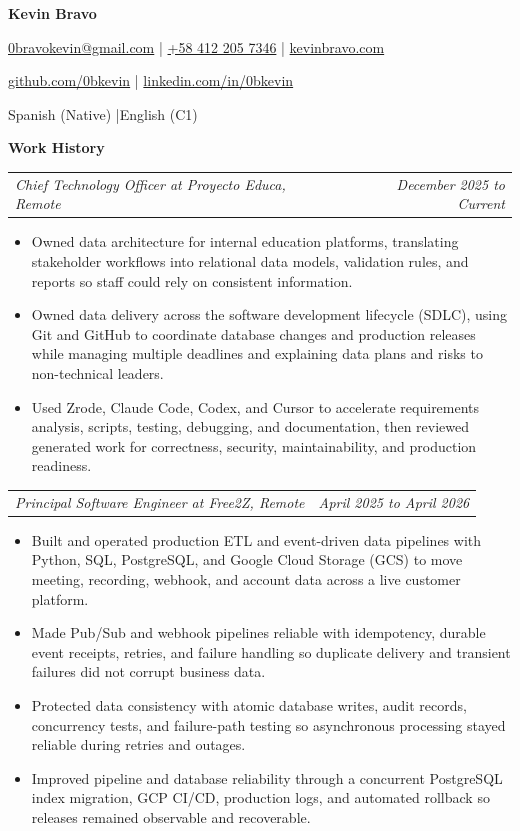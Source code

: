 \documentclass[10pt,letterpaper]{article}
\makeatletter
\newcommand{\bodyfont}{\fontsize{10.5}{15.75}\selectfont}
\newcommand{\contactfont}{\fontsize{12}{15}\selectfont}
\newcommand{\sectiontitle}[1]{%
  \vspace{4pt}
  {\bodyfont\textbf{#1}}\par
  \nopagebreak[4]
  \vspace{2pt}
}
\newcommand{\roleline}[2]{%
  \begin{tabularx}{\textwidth}{@{}Xr@{}}
    \bodyfont\textit{#1} & \bodyfont\textit{#2}
  \end{tabularx}
  \nopagebreak[4]
  \vspace{1pt}
}
\makeatother
\begin{document}
\bodyfont
\raggedright

\begin{center}
  {\fontsize{14}{17}\selectfont\textbf{Kevin Bravo}}\par
  \vspace{3pt}
  {\contactfont
    \href{mailto:0bravokevin@gmail.com}{0bravokevin@gmail.com}
    \enspace|\enspace
    \href{tel:+584122057346}{+58 412 205 7346}
    \enspace|\enspace
    \href{https://kevinbravo.com}{kevinbravo.com}
  }\par
  {\contactfont
    \href{https://github.com/0bkevin}{github.com/0bkevin}
    \enspace|\enspace
    \href{https://www.linkedin.com/in/0bkevin/}{linkedin.com/in/0bkevin}
  }\par
  {\contactfont Spanish (Native) \enspace|\enspace English (C1)}
\end{center}

\sectiontitle{Work History}

\roleline{Chief Technology Officer at Proyecto Educa, Remote}{December 2025 to Current}
\begin{itemize}
  \item Owned data architecture for internal education platforms, translating stakeholder workflows into relational data models, validation rules, and reports so staff could rely on consistent information.
  \item Owned data delivery across the software development lifecycle (SDLC), using Git and GitHub to coordinate database changes and production releases while managing multiple deadlines and explaining data plans and risks to non-technical leaders.
  \item Used Zrode, Claude Code, Codex, and Cursor to accelerate requirements analysis, scripts, testing, debugging, and documentation, then reviewed generated work for correctness, security, maintainability, and production readiness.
\end{itemize}

\vspace{3pt}
\roleline{Principal Software Engineer at Free2Z, Remote}{April 2025 to April 2026}
\begin{itemize}
  \item Built and operated production ETL and event-driven data pipelines with Python, SQL, PostgreSQL, and Google Cloud Storage (GCS) to move meeting, recording, webhook, and account data across a live customer platform.
  \item Made Pub/Sub and webhook pipelines reliable with idempotency, durable event receipts, retries, and failure handling so duplicate delivery and transient failures did not corrupt business data.
  \item Protected data consistency with atomic database writes, audit records, concurrency tests, and failure-path testing so asynchronous processing stayed reliable during retries and outages.
  \item Improved pipeline and database reliability through a concurrent PostgreSQL index migration, GCP CI/CD, production logs, and automated rollback so releases remained observable and recoverable.
\end{itemize}
\end{document}
